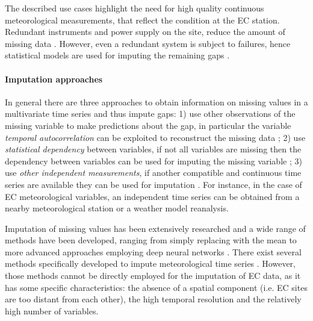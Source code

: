 \documentclass{article}
\begin{document}
The described use cases highlight the need for high quality continuous meteorological measurements, that reflect the condition at the EC station. Redundant instruments and power supply on the site, reduce the amount of missing data \cite{aubinet_eddy_2012-1}. However, even a redundant system is subject to failures, hence statistical models are used for imputing the remaining gaps \cite{aubinet_eddy_2012-1}.

\paragraph{Imputation approaches} In general there are three approaches to obtain information on missing values in a multivariate time series and thus impute gaps:
1) use other observations of the missing variable to make predictions about the gap, in particular the variable \emph{temporal autocorrelation} can be exploited to reconstruct the missing data \cite{moritz_comparison_nodate};
2) use \emph{statistical dependency} between variables, if not all variables are missing then the dependency between variables can be used for imputing the missing variable \cite{moffat_comprehensive_2007};
3) use \emph{other independent measurements}, if another compatible and continuous time series are available they can be used for imputation \cite{vuichard_filling_2015}. For instance, in the case of EC meteorological variables, an independent time series can be obtained from a nearby meteorological station or a weather model reanalysis. 

Imputation of missing values has been extensively researched and a wide range of methods have been developed, ranging from simply replacing with the mean to more advanced approaches employing deep neural networks \cite{moritz_r_2017, fang_time_2020-1, buuren_mice_2011, du_saits_2022-1, zhang_dual-head_2021-2, cao_brits_nodate}. There exist several methods specifically developed to impute meteorological time series \cite{costa_gap_2021, jing_multi-imputation_2022}. However, those methods cannot be directly employed for the imputation of EC data, as it has some specific characteristics: the absence of a spatial component (i.e. EC sites are too distant from each other), the high temporal resolution and the relatively high number of variables. 
\end{document}

